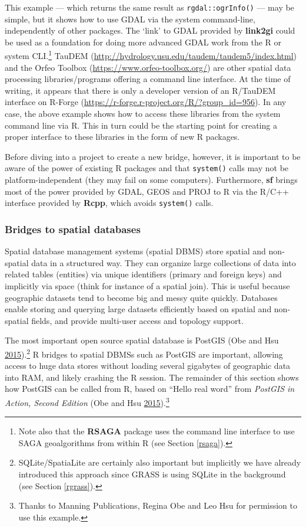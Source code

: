 \documentclass[]{krantz}
\let\rmarkdownfootnote\footnote%
\def\footnote{\protect\rmarkdownfootnote}
\begin{document}
This example --- which returns the same result as \texttt{rgdal::ogrInfo()} --- may be simple, but it shows how to use GDAL via the system command-line, independently of other packages.
The `link' to GDAL provided by \textbf{link2gi} could be used as a foundation for doing more advanced GDAL work from the R or system CLI.\footnote{Note also that the \textbf{RSAGA} package uses the command line interface to use SAGA geoalgorithms from within R (see Section \ref{rsaga}). }
TauDEM (\url{http://hydrology.usu.edu/taudem/taudem5/index.html}) and the Orfeo Toolbox (\url{https://www.orfeo-toolbox.org/}) are other spatial data processing libraries/programs offering a command line interface.
At the time of writing, it appears that there is only a developer version of an R/TauDEM interface on R-Forge (\url{https://r-forge.r-project.org/R/?group_id=956}).
In any case, the above example shows how to access these libraries from the system command line via R.
This in turn could be the starting point for creating a proper interface to these libraries in the form of new R packages.

Before diving into a project to create a new bridge, however, it is important to be aware of the power of existing R packages and that \texttt{system()} calls may not be platform-independent (they may fail on some computers).
Furthermore, \textbf{sf} brings most of the power provided by GDAL, GEOS and PROJ to R via the R/C++ interface provided by \textbf{Rcpp}, which avoids \texttt{system()} calls.

\hypertarget{postgis}{%
\subsubsection{Bridges to spatial databases}\label{postgis}}

Spatial database management systems (spatial DBMS) store spatial and non-spatial data in a structured way.
They can organize large collections of data into related tables (entities) via unique identifiers (primary and foreign keys) and implicitly via space (think for instance of a spatial join).
This is useful because geographic datasets tend to become big and messy quite quickly.
Databases enable storing and querying large datasets efficiently based on spatial and non-spatial fields, and provide multi-user access and topology support.

The most important open source spatial database is PostGIS (Obe and Hsu \protect\hyperlink{ref-obe_postgis_2015}{2015}).\footnote{SQLite/SpatiaLite are certainly also important but implicitly we have already introduced this approach since GRASS is using SQLite in the background (see Section \ref{rgrass}).}
R bridges to spatial DBMSs such as PostGIS are important, allowing access to huge data stores without loading several gigabytes of geographic data into RAM, and likely crashing the R session.
The remainder of this section shows how PostGIS can be called from R, based on ``Hello real word'' from \emph{PostGIS in Action, Second Edition} (Obe and Hsu \protect\hyperlink{ref-obe_postgis_2015}{2015}).\footnote{Thanks to Manning Publications, Regina Obe and Leo Hsu for permission to use this example.}
\end{document}
